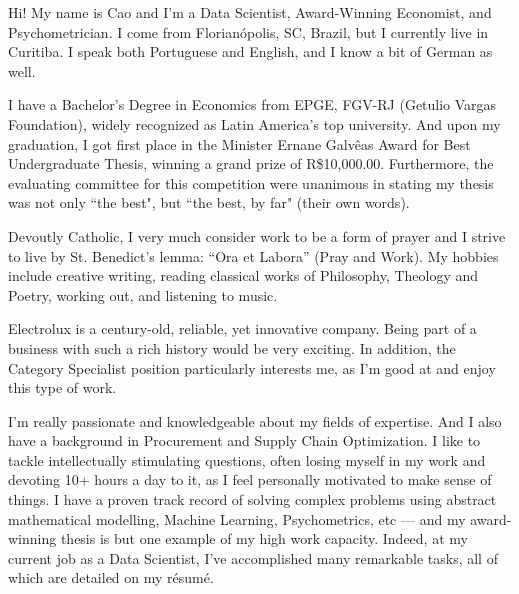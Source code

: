\documentclass[11pt, a4paper]{awesome-cv} %
\begin{document}
\makecvheader %

\makelettertitle %


\begin{cvletter}



Hi! My name is Cao and I’m a Data Scientist, Award-Winning Economist, and Psychometrician. I come from Florianópolis, SC, Brazil, but I currently live in Curitiba. I speak both Portuguese and English, and I know a bit of German as well.

I have a Bachelor’s Degree in Economics from EPGE, FGV-RJ (Getulio Vargas Foundation), widely recognized as Latin America's top university. And upon my graduation, I got first place in the Minister Ernane Galvêas Award for Best Undergraduate Thesis, winning a grand prize of R\$10,000.00. Furthermore, the evaluating committee for this competition were unanimous in stating my thesis was not only ``the best", but ``the best, by far" (their own words).

Devoutly Catholic, I very much consider work to be a form of prayer and I strive to live by St. Benedict’s lemma: “Ora et Labora” (Pray and Work). My hobbies include creative writing, reading classical works of Philosophy, Theology and Poetry, working out, and listening to music.

Electrolux is a century-old, reliable, yet innovative company. Being part of a business with such a rich history would be very exciting. In addition, the Category Specialist position particularly interests me, as I'm good at and enjoy this type of work. 

I'm really passionate and knowledgeable about my fields of expertise. And I also have a background in Procurement and Supply Chain Optimization. I like to tackle intellectually stimulating questions, often losing myself in my work and devoting 10+ hours a day to it, as I feel personally motivated to make sense of things. I have a proven track record of solving complex problems using abstract mathematical modelling, Machine Learning, Psychometrics, etc --- and my award-winning thesis is but one example of my high work capacity. Indeed, at my current job as a Data Scientist, I’ve accomplished many remarkable tasks, all of which are detailed on my résumé.

\end{cvletter}


\makeletterclosing %
\end{document}
